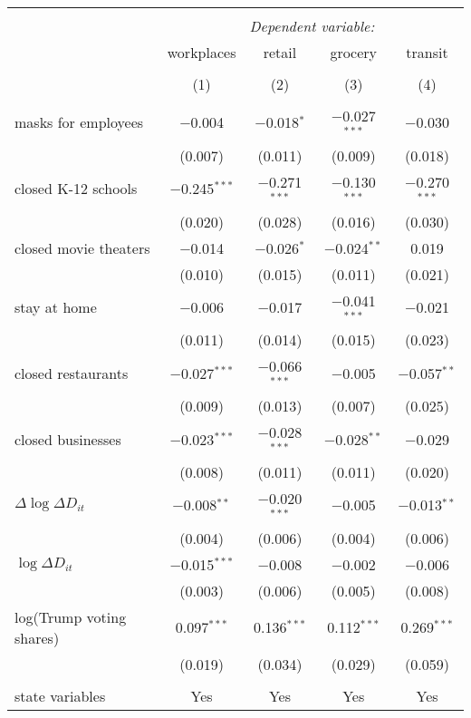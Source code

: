 \begin{tabular}{@{\extracolsep{1pt}}lcccc} 
\\[-1.8ex]\hline 
\hline \\[-1.8ex] 
 & \multicolumn{4}{c}{\textit{Dependent variable:}} \\ 
\cline{2-5} 
 & workplaces & retail & grocery & transit \\ 
\\[-1.8ex] & (1) & (2) & (3) & (4)\\ 
\hline \\[-1.8ex] 
 masks for employees & $-$0.004 & $-$0.018$^{*}$ & $-$0.027$^{***}$ & $-$0.030 \\ 
  & (0.007) & (0.011) & (0.009) & (0.018) \\ 
  closed K-12 schools & $-$0.245$^{***}$ & $-$0.271$^{***}$ & $-$0.130$^{***}$ & $-$0.270$^{***}$ \\ 
  & (0.020) & (0.028) & (0.016) & (0.030) \\ 
  closed movie theaters & $-$0.014 & $-$0.026$^{*}$ & $-$0.024$^{**}$ & 0.019 \\ 
  & (0.010) & (0.015) & (0.011) & (0.021) \\ 
  stay at home & $-$0.006 & $-$0.017 & $-$0.041$^{***}$ & $-$0.021 \\ 
  & (0.011) & (0.014) & (0.015) & (0.023) \\ 
  closed restaurants & $-$0.027$^{***}$ & $-$0.066$^{***}$ & $-$0.005 & $-$0.057$^{**}$ \\ 
  & (0.009) & (0.013) & (0.007) & (0.025) \\ 
  closed businesses & $-$0.023$^{***}$ & $-$0.028$^{***}$ & $-$0.028$^{**}$ & $-$0.029 \\ 
  & (0.008) & (0.011) & (0.011) & (0.020) \\ 
  $\Delta \log \Delta D_{it}$ & $-$0.008$^{**}$ & $-$0.020$^{***}$ & $-$0.005 & $-$0.013$^{**}$ \\ 
  & (0.004) & (0.006) & (0.004) & (0.006) \\ 
  $\log \Delta D_{it}$ & $-$0.015$^{***}$ & $-$0.008 & $-$0.002 & $-$0.006 \\ 
  & (0.003) & (0.006) & (0.005) & (0.008) \\ 
  log(Trump voting shares) & 0.097$^{***}$ & 0.136$^{***}$ & 0.112$^{***}$ & 0.269$^{***}$ \\ 
  & (0.019) & (0.034) & (0.029) & (0.059) \\ 
 \hline \\[-1.8ex] 
state variables & Yes & Yes & Yes & Yes \\ 

\end{tabular}
